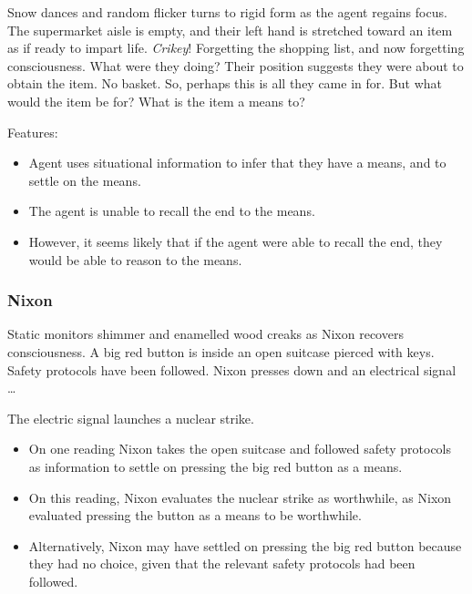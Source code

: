 \documentclass[10pt]{article}
\newcommand{\hozlinedash}[0]{%
  \noindent\hdashrule[0.5ex][c]{\textwidth}{.1pt}{2.5pt}
}
\begin{document}
\begin{scenario}
  Snow dances and random flicker turns to rigid form as the agent regains focus.
  The supermarket aisle is empty, and their left hand is stretched toward an item as if ready to impart life.
  \emph{Crikey}!
  Forgetting the shopping list, and now forgetting consciousness.
  What were they doing?
  Their position suggests they were about to obtain the item.
  No basket. So, perhaps this is all they came in for.
  But what would the item be for? What is the item a means to?
\end{scenario}

Features:
\begin{itemize}[noitemsep]
\item Agent uses situational information to infer that they have a means, and to settle on the means.
\item The agent is unable to recall the end to the means.
\item However, it seems likely that if the agent were able to recall the end, they would be able to reason to the means.
\end{itemize}


\subsubsection{Nixon}
\label{sec:nixon}

\begin{scenario}[Nixon]
  Static monitors shimmer and enamelled wood creaks as Nixon recovers consciousness.
  A big red button is inside an open suitcase pierced with keys.
  Safety protocols have been followed.
  Nixon presses down and an electrical signal \dots
\end{scenario}

The electric signal launches a nuclear strike.

\hozlinedash

\begin{itemize}[noitemsep]
\item On one reading Nixon takes the open suitcase and followed safety protocols as information to settle on pressing the big red button as a means.
\item On this reading, Nixon evaluates the nuclear strike as worthwhile, as Nixon evaluated pressing the button as a means to be worthwhile.
\item Alternatively, Nixon may have settled on pressing the big red button because they had no choice, given that the relevant safety protocols had been followed.
\end{itemize}
\end{document}
